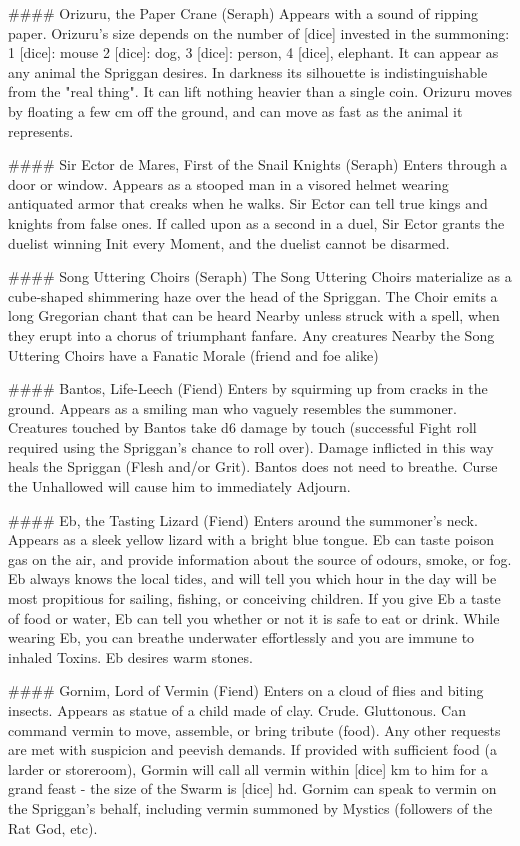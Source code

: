 #### Orizuru, the Paper Crane (Seraph)
Appears with a sound of ripping paper.  Orizuru's size depends on the number of [dice] invested in the summoning: 1 [dice]: mouse 2 [dice]: dog, 3 [dice]: person, 4 [dice], elephant.  It can appear as any animal the Spriggan desires.  In darkness its silhouette is indistinguishable from the "real thing".   It can lift nothing heavier than a single coin. Orizuru moves by floating a few cm off the ground, and can move as fast as the animal it represents. 


#### Sir Ector de Mares, First of the Snail Knights (Seraph)
Enters through a door or window.  Appears as a stooped man in a visored helmet wearing antiquated armor that creaks when he walks.  Sir Ector can tell true kings and knights from false ones.  If called upon as a second in a duel, Sir Ector grants the duelist winning Init every Moment, and the duelist cannot be disarmed.



#### Song Uttering Choirs (Seraph)
The Song Uttering Choirs materialize as a cube-shaped shimmering haze over the head of the Spriggan.  The Choir emits a long Gregorian chant that can be heard Nearby unless struck with a spell, when they erupt into a chorus of triumphant fanfare.  Any creatures Nearby the Song Uttering Choirs have a Fanatic Morale (friend and foe alike)



####  Bantos, Life-Leech (Fiend)
Enters by squirming up from cracks in the ground. Appears as a smiling man who vaguely resembles the summoner. Creatures touched by Bantos take d6 damage by touch (successful Fight roll required using the Spriggan's chance to roll over). Damage inflicted in this way heals the Spriggan (Flesh and/or Grit).  Bantos does not need to breathe.  Curse the Unhallowed will cause him to immediately Adjourn. 

####  Eb, the Tasting Lizard (Fiend)
Enters around the summoner's neck. Appears as a sleek yellow lizard with a bright blue tongue. Eb can taste poison gas on the air, and provide information about the source of odours, smoke, or fog. Eb always knows the local tides, and will tell you which hour in the day will be most propitious for sailing, fishing, or conceiving children. If you give Eb a taste of food or water, Eb can tell you whether or not it is safe to eat or drink.  While wearing Eb, you can breathe underwater effortlessly and you are immune to inhaled Toxins.  Eb desires warm stones.


####  Gornim, Lord of Vermin (Fiend)
Enters on a cloud of flies and biting insects. Appears as statue of a child made of clay. Crude. Gluttonous. Can command vermin to move, assemble, or bring tribute (food). Any other requests are met with suspicion and peevish demands. If provided with sufficient food (a larder or storeroom), Gormin will call all vermin within [dice] km to him for a grand feast - the size of the Swarm is [dice] {hd}.  Gornim can speak to vermin on the Spriggan's behalf, including vermin summoned by Mystics (followers of the Rat God, etc).  


